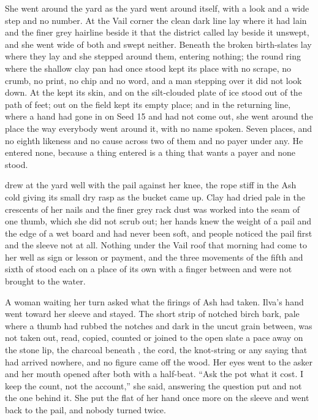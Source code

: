 She went around the yard as the yard went around itself, with a look and a wide step and no number. At the Vail corner the clean dark line lay where it had lain and the finer grey hairline beside it that the district called  lay beside it unswept, and she went wide of both and swept neither. Beneath  the broken birth-slates lay where they lay and she stepped around them, entering nothing; the round ring where the shallow clay pan had once stood kept its place with no scrape, no crumb, no print, no chip and no word, and a man stepping over it did not look down. At  the  kept its skin, and on  the silt-clouded plate of ice stood out of the path of feet; out on  the field kept its empty place; and in the returning line, where a hand had gone in on Seed 15 and had not come out, she went around the place the way everybody went around it, with no name spoken. Seven places, and no eighth likeness and no cause across two of them and no payer under any. He entered none, because a thing entered is a thing that wants a payer and none stood.

\scenebreak

 drew at the yard well with the pail against her knee, the rope stiff in the Ash cold giving its small dry rasp as the bucket came up. Clay had dried pale in the crescents of her nails and the finer grey rack dust was worked into the seam of one thumb, which she did not scrub out; her hands knew the weight of a pail and the edge of a wet board and had never been soft, and people noticed the pail first and the sleeve not at all. Nothing under the Vail roof that morning had come to her well as sign or lesson or payment, and the three movements of the fifth and sixth of  stood each on a place of its own with a finger between and were not brought to the water.

A woman waiting her turn asked what the firings of Ash had taken. Ilva's hand went toward her sleeve and stayed. The short strip of notched birch bark, pale where a thumb had rubbed the notches and dark in the uncut grain between, was not taken out, read, copied, counted or joined to the open slate a pace away on the stone lip, the charcoal beneath , the cord, the knot-string or any saying that had arrived nowhere, and no figure came off the wood. Her eyes went to the asker and her mouth opened after both with a half-beat. “Ask the pot what it cost. I keep the count, not the account,” she said, answering the question put and not the one behind it. She put the flat of her hand once more on the sleeve and went back to the pail, and nobody turned twice.

